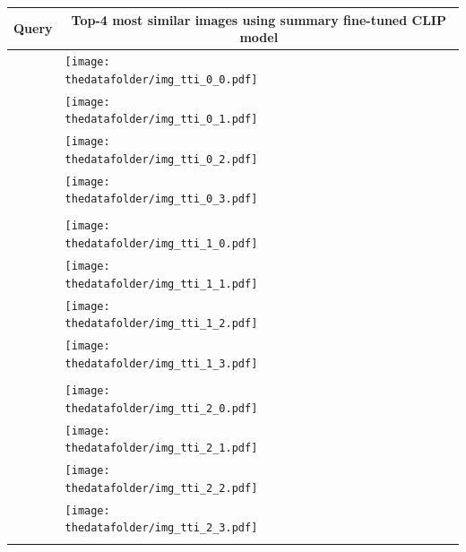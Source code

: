 \documentclass[10pt]{article} %
\begin{document}
\begin{table}[h!]
  \centering
  \begin{tabular}{m{3cm} p{3cm} p{3cm} p{3cm} p{3cm}}
      \toprule
      \centering \bfseries Query & \multicolumn{4}{c}{\bfseries{Top-4 most similar images using \textcolor{deepred}{summary fine-tuned CLIP model}}} \tabularnewline
      \midrule
       \texttt{} \vspace{20mm} & \centering \texttt{[image: \\thedatafolder/img\_tti\_0\_0.pdf]} \\  & \centering \texttt{[image: \\thedatafolder/img\_tti\_0\_1.pdf]} \\  & \centering \texttt{[image: \\thedatafolder/img\_tti\_0\_2.pdf]} \\  & \centering \texttt{[image: \\thedatafolder/img\_tti\_0\_3.pdf]} \\   \tabularnewline
      \midrule
      \texttt{} \vspace{20mm} & \centering \texttt{[image: \\thedatafolder/img\_tti\_1\_0.pdf]} \\  & \centering \texttt{[image: \\thedatafolder/img\_tti\_1\_1.pdf]} \\  & \centering \texttt{[image: \\thedatafolder/img\_tti\_1\_2.pdf]} \\  & \centering \texttt{[image: \\thedatafolder/img\_tti\_1\_3.pdf]} \\   \tabularnewline
      \midrule
      \texttt{} \vspace{20mm} & \centering \texttt{[image: \\thedatafolder/img\_tti\_2\_0.pdf]} \\  & \centering \texttt{[image: \\thedatafolder/img\_tti\_2\_1.pdf]} \\  & \centering \texttt{[image: \\thedatafolder/img\_tti\_2\_2.pdf]} \\  & \centering \texttt{[image: \\thedatafolder/img\_tti\_2\_3.pdf]} \\   \tabularnewline

\end{tabular}
\end{table}
\end{document}
